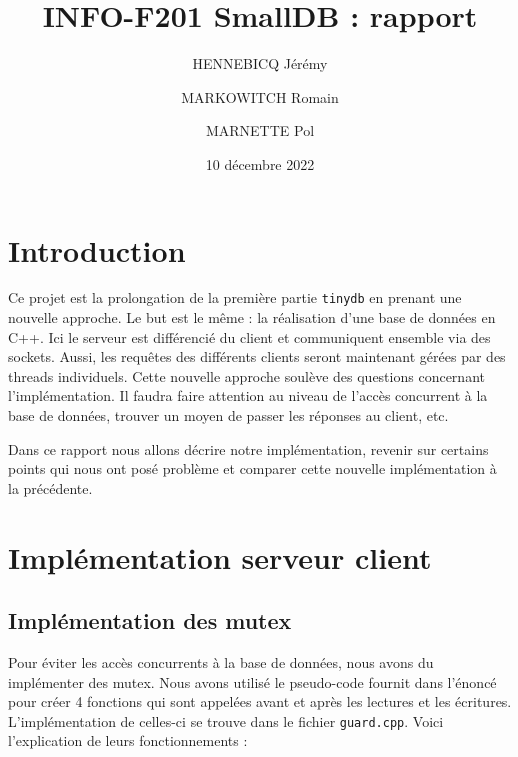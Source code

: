 \documentclass[utf8]{article}
\title{INFO-F201 SmallDB : rapport}
\author{HENNEBICQ Jérémy\and MARKOWITCH Romain \and MARNETTE Pol}
\date{10 décembre 2022}
\begin{document}
\maketitle
\tableofcontents

\newpage


\section{Introduction}

Ce projet est la prolongation de la première partie \texttt{tinydb} en prenant une nouvelle approche. Le but est le même : la réalisation d'une base de données en C++. Ici le serveur est différencié du client et communiquent ensemble via des sockets. Aussi, les requêtes des différents clients seront maintenant gérées par des threads individuels. Cette nouvelle approche soulève des questions concernant l'implémentation. Il faudra faire attention au niveau de l'accès concurrent à la base de données, trouver un moyen de passer les réponses au client, etc.

Dans ce rapport nous allons décrire notre implémentation, revenir sur certains points qui nous ont posé problème et comparer cette nouvelle implémentation à la précédente.

\section{Implémentation serveur client}

\subsection{Implémentation des mutex}


Pour éviter les accès concurrents à la base de données, nous avons du implémenter des mutex. Nous avons utilisé le pseudo-code fournit dans l'énoncé pour créer 4 fonctions qui sont appelées avant et après les lectures et les écritures. L'implémentation de celles-ci se trouve dans le fichier \texttt{guard.cpp}. Voici l'explication de leurs fonctionnements :
\end{document}
